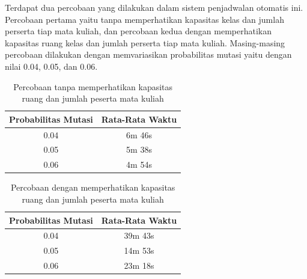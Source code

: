 Terdapat dua percobaan yang dilakukan dalam sistem penjadwalan otomatis ini. Percobaan pertama yaitu tanpa memperhatikan kapasitas kelas dan jumlah perserta tiap mata kuliah, dan percobaan kedua dengan memperhatikan kapasitas ruang kelas dan jumlah perserta tiap mata kuliah.
Masing-masing percobaan dilakukan dengan memvariasikan probabilitas mutasi yaitu dengan nilai 0.04, 0.05, dan 0.06.
\begin{longtable}{|c|c|}
  \caption{Percobaan tanpa memperhatikan kapasitas \linebreak ruang dan jumlah peserta mata kuliah}
  \label{tab:tanpaKapasitas}\\
  \hline
  \rowcolor[HTML]{C0C0C0} 
{\color[HTML]{000000} \textbf{Probabilitas Mutasi}} & {\color[HTML]{000000} \textbf{Rata-Rata Waktu}} \\ \hline
0.04                                                & 6m 46s                                           \\ \hline
0.05                                                & 5m 38s                                           \\ \hline
0.06                                                & 4m 54s                                           \\ \hline
\end{longtable}

\begin{longtable}{|c|c|}
  \caption{Percobaan dengan memperhatikan kapasitas \linebreak ruang dan jumlah peserta mata kuliah}
  \label{tab:denganKapasitas}\\
  \hline
  \rowcolor[HTML]{C0C0C0} 
{\color[HTML]{000000} \textbf{Probabilitas Mutasi}} & {\color[HTML]{000000} \textbf{Rata-Rata Waktu}} \\ \hline
0.04                                                & 39m 43s                                         \\ \hline
0.05                                                & 14m 53s                                         \\ \hline
0.06                                                & 23m 18s                                         \\ \hline
\end{longtable}



